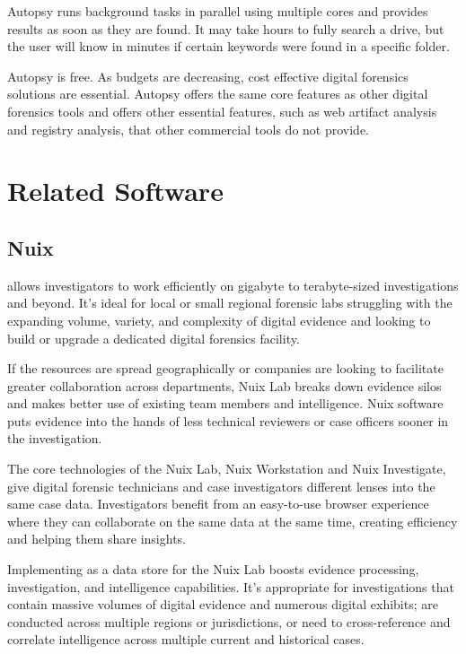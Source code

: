 Autopsy runs background tasks in parallel using multiple cores and provides results as soon as they are found.
It may take hours to fully search a drive, but the user will know in minutes if certain keywords were found in a specific folder.

Autopsy is free. As budgets are decreasing, cost effective digital forensics solutions are essential. Autopsy offers
the same core features as other digital forensics tools and offers other essential features, such as web artifact analysis
and registry analysis, that other commercial tools do not provide.

\section{Related Software}

\subsection{Nuix}

 \cite{nuix} allows investigators to work efficiently on gigabyte to terabyte-sized investigations and beyond.
It’s ideal for local or small regional forensic labs struggling with the expanding volume, variety, and 
complexity of digital evidence and looking to build or upgrade a dedicated digital forensics facility.

If the resources are spread geographically or companies are looking to facilitate greater collaboration across departments,
Nuix Lab breaks down evidence silos and makes better use of existing team members and intelligence. Nuix software puts 
evidence into the hands of less technical reviewers or case officers sooner in the investigation.

The core technologies of the Nuix Lab, Nuix Workstation and Nuix Investigate, give digital forensic technicians and case investigators 
different lenses into the same case data. Investigators benefit from an easy-to-use browser experience where they can collaborate on 
the same data at the same time, creating efficiency and helping them share insights.

Implementing  \cite{elasticsearch} as a data store for the Nuix Lab boosts evidence processing, investigation, and intelligence capabilities. 
It’s appropriate for investigations that contain massive volumes of digital evidence and numerous digital exhibits; are conducted across multiple
regions or jurisdictions, or need to cross-reference and correlate intelligence across multiple current and historical cases. 

